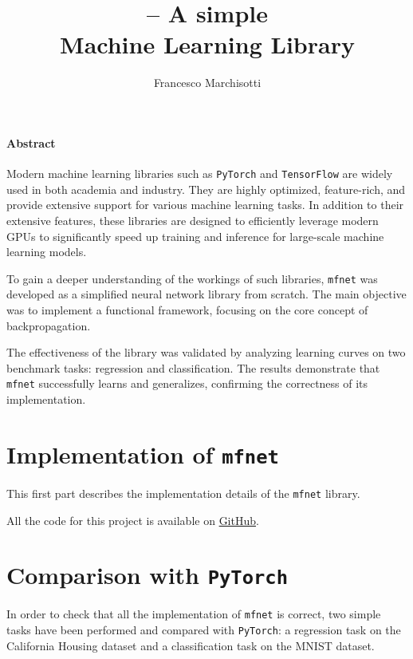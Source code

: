 \documentclass{unitothesis}
\author{Francesco Marchisotti}
\title{\centering\mfnet \sc-- A simple\\[0.5em] Machine Learning Library}
\newcommand{\mono}[1]{\texttt{#1}}
\newcommand{\mfnet}{\mono{mfnet}\xspace}
\newcommand{\pytorch}{\mono{PyTorch}\xspace}
\begin{document}
\maketitlepage
\thispagestyle{empty}
\subsection*{\centering Abstract}
Modern machine learning libraries such as \pytorch and \mono{TensorFlow} are widely used in both academia and industry. They are highly optimized, feature-rich, and provide extensive support for various machine learning tasks. In addition to their extensive features, these libraries are designed to efficiently leverage modern GPUs to significantly speed up training and inference for large-scale machine learning models.

To gain a deeper understanding of the workings of such libraries, \mfnet was developed as a simplified neural network library from scratch. The main objective was to implement a functional framework, focusing on the core concept of backpropagation.

The effectiveness of the library was validated by analyzing learning curves on two benchmark tasks: regression and classification. The results demonstrate that \mfnet successfully learns and generalizes, confirming the correctness of its implementation.

\newpage

{\hypersetup{linkcolor=black}\tableofcontents}



\part{Implementation of \mfnet}

This first part describes the implementation details of the \mfnet library.

All the code for this project is available on \href{https://www.github.com/marchfra/mfnet}{GitHub}.









\part{Comparison with \pytorch}

In order to check that all the implementation of \mfnet is correct, two simple tasks have been performed and compared with \pytorch: a regression task on the California Housing dataset and a classification task on the MNIST dataset.
\end{document}
